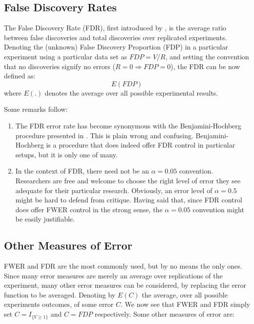 \documentclass[review,12pt]{article}
\begin{document}
\subsection{\label{sub:fdr}False Discovery Rates}

The False Discovery Rate (FDR), first introduced by \citet{benjamini_controlling_1995}, is the average ratio between false discoveries and total discoveries over replicated experiments. 
Denoting the (unknown) False Discovery Proportion (FDP) in a particular experiment using a particular data set as $ FDP=V/R $, and setting the convention that no discoveries signify no errors ($R=0 \Rightarrow FDP=0$), the FDR can be now defined as:
$$E \left( FDP \right)$$ 
where $E(.)$ denotes the average over all possible experimental results.


Some remarks follow:
\begin{enumerate}
\item The FDR error rate has become synonymous with the Benjamini-Hochberg procedure presented in \citep{benjamini_controlling_1995} . This is plain wrong and confusing. Benjamini-Hochberg is a procedure that does indeed offer FDR control in particular setups, but it is only one of many.
\item In the context of FDR, there need not be an $\alpha=0.05$ convention. Researchers are free and welcome to choose the right level of error they see adequate for their particular research. Obviously, an error level of $\alpha=0.5$ might be hard to defend from critique. Having said that, since FDR control does offer FWER control in the strong sense, the $\alpha=0.05$ convention might be easily justifiable.
\end{enumerate}




\subsection{Other Measures of Error}
FWER and FDR are the most commonly used, but by no means the only ones. Since many error measures are merely an average over replications of the experiment, many other error measures can be considered, by replacing the error function to be averaged. Denoting by $E(C)$ the average, over all possible experiments outcomes, of some error $C$. We now see that FWER and FDR simply set  $C = I_{\{ V \geq 1 \} } $ and $C = FDP$ respectively.
Some other measures of error are:
\end{document}
